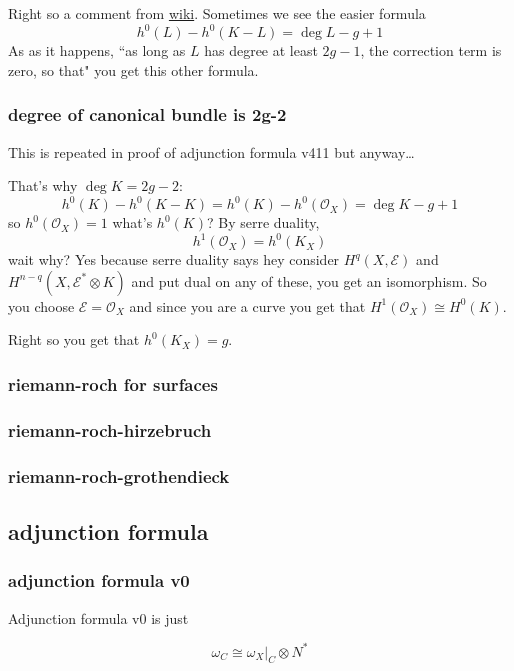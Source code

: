 Right so a comment from \href{https://en.wikipedia.org/wiki/Riemann%E2%80%93Roch_theorem}{wiki}. Sometimes we see the easier formula
	\[\boxed{h^0(L)-h^0(K-L)=\operatorname{deg}L-g+1}\]
	As as it happens, ``as long as \(L\) has degree at least \(2g-1\), the correction term is zero, so that" you get this other formula.

\subsubsection*{degree of canonical bundle is 2g-2}
This is repeated in proof of adjunction formula v411 but anyway…

That's why \(\operatorname{deg}K=2g-2\):
\[h^0(K)-h^0(K-K)=h^0(K)-h^0(\mathcal{O}_X)=\operatorname{deg}K-g+1\]
so \(h^0(\mathcal{O}_X)=1\) what's \(h^0(K)\)? By serre duality,
\[h^1(\mathcal{O}_X)=h^0(K_X)\]
wait why? Yes because serre duality says hey consider \(H^q(X,\mathcal{E})\) and \(H^{n-q}(X,\mathcal{E}^* \otimes K)\) and put dual on any of these, you get an isomorphism. So you choose \(\mathcal{E}=\mathcal{O}_X\) and since you are a curve you get that \(H^{1}(\mathcal{O}_X)\cong H^{0}(K)\).

Right so you get that \(h^0(K_X)=g\).

\subsubsection{riemann-roch for surfaces}

\subsubsection{riemann-roch-hirzebruch}

\subsubsection{riemann-roch-grothendieck}


\subsection{adjunction formula}

\subsubsection{adjunction formula v0}

Adjunction formula v0 is just

\[
\omega_C \cong \omega_X|_C \otimes N^*
\]

